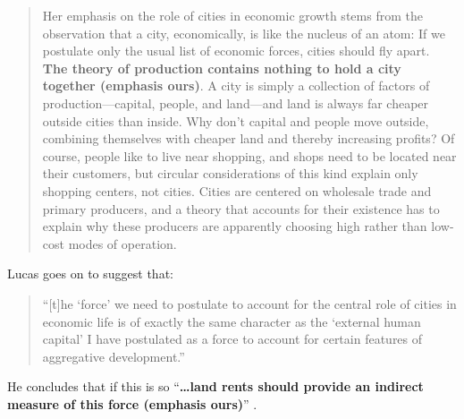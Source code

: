 \begin{quotation}
    \noindent Her emphasis on the role of cities in economic growth stems from the observation that a city, economically, is like the nucleus of an atom: If we postulate only the usual list of economic forces, cities should fly apart. \textbf{The theory of production contains nothing to hold a city together (emphasis ours)}. A city is simply a collection of factors of production---capital, people, and land---and land is always far cheaper outside cities than inside. Why don't capital and people move outside, combining themselves with cheaper land and thereby increasing profits? Of course, people like to live near shopping, and shops need to be located near their customers, but circular considerations of this kind explain only shopping centers, not cities. Cities are centered on wholesale trade and primary producers, and a theory that accounts for their existence has to explain why these producers are apparently choosing high rather than low-cost modes of operation. \cite{lucasMechanicsEconomicDevelopment1988}
\end{quotation}


Lucas goes on to suggest that: 
\begin{quotation} 
    \noindent ``[t]he `force' we need to postulate to account for the central role of cities in economic life is of exactly the same character as the `external human capital' I have postulated as a force to account for certain features of aggregative development.''
\end{quotation} 

\noindent He concludes that if this is so ``\textbf{\dots land rents should provide an indirect measure of this force (emphasis ours)}'' %
\cite{lucasMechanicsEconomicDevelopment1988}.  



